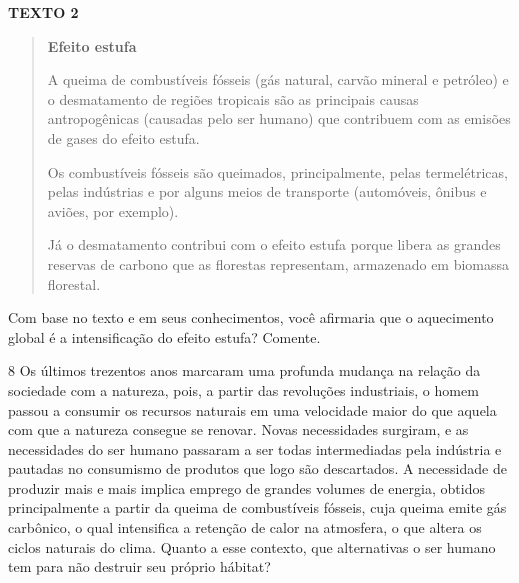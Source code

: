 \textbf{TEXTO 2}
\begin{quote}
\textbf{Efeito estufa}

A queima de combustíveis fósseis (gás natural, carvão mineral e petróleo) e o desmatamento de regiões tropicais são as principais causas antropogênicas (causadas pelo ser humano) que contribuem com as emisões de gases do efeito estufa.

Os combustíveis fósseis são queimados, principalmente, pelas termelétricas, pelas indústrias e por alguns meios de transporte (automóveis, ônibus e aviões, por exemplo).

Já o desmatamento contribui com o efeito estufa porque libera as grandes reservas de carbono que as florestas representam, armazenado em biomassa florestal.

\end{quote}

Com base no texto e em seus conhecimentos, você afirmaria que o aquecimento global é a intensificação do
efeito estufa? Comente.



\num{8} Os últimos trezentos anos marcaram uma profunda mudança na relação da
sociedade com a natureza, pois, a partir das revoluções
industriais, o homem passou a consumir os recursos naturais em uma
velocidade maior do que aquela com que a natureza consegue se renovar. 
Novas necessidades surgiram, e as necessidades do ser humano
passaram a ser todas intermediadas pela indústria e pautadas no
consumismo de produtos que logo são descartados. A necessidade de
produzir mais e mais implica emprego de grandes volumes de
energia, obtidos principalmente a partir da queima de
combustíveis fósseis, cuja queima emite gás carbônico, o qual intensifica a retenção de calor na atmosfera,
o que altera os ciclos naturais do clima.
Quanto a esse contexto, que alternativas o ser humano tem para não destruir seu próprio hábitat?


